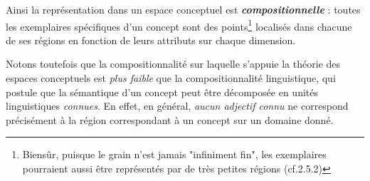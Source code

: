 \documentclass{article}
\newcommand{\bolditalic}[1]{\textbf{\textit{#1}}}
\begin{document}
Ainsi la représentation dans un espace conceptuel est \bolditalic{compositionnelle} : toutes les exemplaires spécifiques d'un concept sont des points\footnote{Biensûr, puisque le grain n'est jamais "infiniment fin", les exemplaires pourraient aussi être représentés par de très petites régions (cf.2.5.2)}  localisés dans chacune de ses régions en fonction de leurs attributs sur chaque dimension.
\par
Notons toutefois que la compositionnalité sur laquelle s’appuie la théorie des espaces conceptuels est \textit{plus faible} que la compositionnalité linguistique, qui postule que la sémantique d’un concept peut être décomposée en unités linguistiques \textit{connues}. En effet, en général, \textit{aucun adjectif connu} ne correspond précisément à la région correspondant à un concept sur un domaine donné. 
\end{document}
